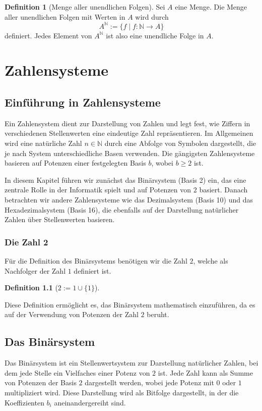 \documentclass{book}
\theoremstyle{plain}
\theoremstyle{remark}
\theoremstyle{definition}
\newtheorem{definition}{Definition}[section]
\begin{document}
\begin{definition}[Menge aller unendlichen Folgen]
    Sei \(A\) eine Menge. Die Menge aller unendlichen Folgen mit Werten in \(A\) wird durch
    \[
    A^{\mathbb{N}} := \{f \mid f: \mathbb{N} \to A\}
    \]
    definiert. Jedes Element von \(A^{\mathbb{N}}\) ist also eine unendliche Folge in \(A\).
\end{definition}




\chapter{Zahlensysteme}

\section{Einführung in Zahlensysteme}
Ein Zahlensystem dient zur Darstellung von Zahlen und legt fest, wie Ziffern in verschiedenen Stellenwerten eine eindeutige Zahl repräsentieren. Im Allgemeinen wird eine natürliche Zahl \( n \in \mathbb{N} \) durch eine Abfolge von Symbolen dargestellt, die je nach System unterschiedliche Basen verwenden. Die gängigsten Zahlensysteme basieren auf Potenzen einer festgelegten Basis \( b \), wobei \( b \geq 2 \) ist.

In diesem Kapitel führen wir zunächst das Binärsystem (Basis 2) ein, das eine zentrale Rolle in der Informatik spielt und auf Potenzen von \(2\) basiert. Danach betrachten wir andere Zahlensysteme wie das Dezimalsystem (Basis 10) und das Hexadezimalsystem (Basis 16), die ebenfalls auf der Darstellung natürlicher Zahlen über Stellenwerten basieren.

\subsection{Die Zahl 2}
Für die Definition des Binärsystems benötigen wir die Zahl \(2\), welche als Nachfolger der Zahl \(1\) definiert ist.

\begin{definition}[\(2 := 1 \cup \{1\}\)]
\end{definition}

Diese Definition ermöglicht es, das Binärsystem mathematisch einzuführen, da es auf der Verwendung von Potenzen der Zahl \(2\) beruht.

\section{Das Binärsystem}
Das Binärsystem ist ein Stellenwertsystem zur Darstellung natürlicher Zahlen, bei dem jede Stelle ein Vielfaches einer Potenz von \(2\) ist. Jede Zahl kann als Summe von Potenzen der Basis \(2\) dargestellt werden, wobei jede Potenz mit \(0\) oder \(1\) multipliziert wird. Diese Darstellung wird als Bitfolge dargestellt, in der die Koeffizienten \(b_i\) aneinandergereiht sind.
\end{document}
